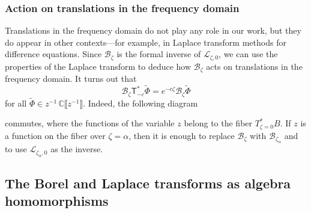 \documentclass{article}
\newcommand{\C}{\mathbb{C}}
\newcommand{\series}[1]{\tilde{#1}}
\newcommand{\laplace}{\mathcal{L}}
\newcommand{\borel}{\mathcal{B}}
\theoremstyle{definition}
\theoremstyle{plain}
\begin{document}
\subsubsection{Action on translations in the frequency domain}
%
Translations in the frequency domain do not play any role in our work, but they do appear in other contexts---for example, in Laplace transform methods for difference equations. Since $\borel_\zeta$ is the formal inverse of $\laplace_{\zeta,0}$, we can use the properties of the Laplace transform to deduce how $\borel_\zeta$ acts on translations in the frequency domain. It turns out that 
\[ \borel_\zeta \mathsf{T}_{-c}^* \series{\Phi} = e^{-c\zeta }\borel_\zeta \series{\Phi} \]
for all $\series{\Phi} \in z^{-1}\,\C\llbracket z^{-1} \rrbracket$.
Indeed, the following diagram
\begin{center}
\end{center}
commutes, where the functions of the variable $z$ belong to the fiber $T^*_{\zeta=0}B$. If $z$ is a function on the fiber over $\zeta=\alpha$, then it is enough to replace $\borel_\zeta$ with $\borel_{\zeta_\alpha}$ and to use  $\laplace_{\zeta_\alpha,0}$ as the inverse. 
%
\subsection{The Borel and Laplace transforms as algebra homomorphisms}\label{sec:borel-laplace-homom}
%
\end{document}
